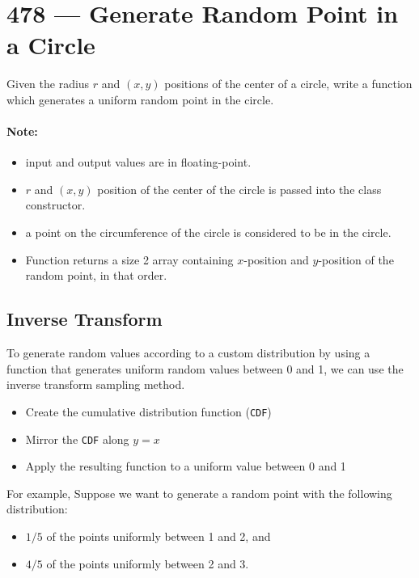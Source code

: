\section{478 --- Generate Random Point in a Circle}
Given the radius $r$ and $(x,y)$ positions of the center of a circle, write a function which generates a uniform random point in the circle.

\paragraph{Note:}

\begin{itemize}
\item input and output values are in floating-point.
\item $r$ and $(x,y)$ position of the center of the circle is passed into the class constructor.
\item a point on the circumference of the circle is considered to be in the circle.
\item Function returns a size 2 array containing $x$-position and $y$-position of the random point, in that order.

\end{itemize}

\subsection{Inverse Transform}
To generate random values according to a custom distribution by using a function that generates uniform random values between 0 and 1, we can use the inverse transform sampling method.

\begin{itemize}
\item Create the cumulative distribution function (\texttt{CDF})
\item Mirror the \texttt{CDF} along $y = x$
\item Apply the resulting function to a uniform value between 0 and 1
\end{itemize}

For example, Suppose we want to generate a random point with the following distribution:

\begin{itemize}
\item $1/5$ of the points uniformly between 1 and 2, and
\item $4/5$ of the points uniformly between 2 and 3.
\end{itemize}

